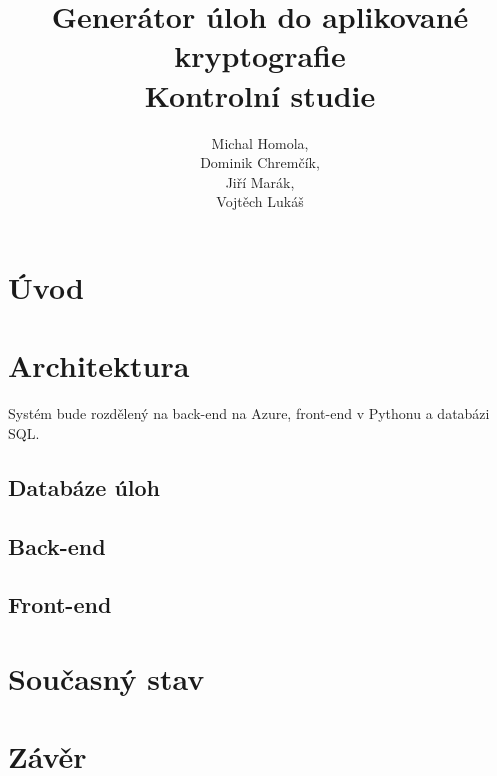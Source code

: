 \documentclass[titlepage]{article}
\title{Generátor úloh do aplikované kryptografie\\Kontrolní studie}
\author{Michal Homola,\\Dominik Chremčík,\\Jiří Marák,\\Vojtěch Lukáš}
\begin{document}
\maketitle

\tableofcontents

\section*{Úvod}

\section{Architektura}
Systém bude rozdělený na back-end na Azure, front-end v Pythonu a databázi SQL. 

\subsection{Databáze úloh}

\subsection{Back-end}

\subsection{Front-end}

\section{Současný stav}

\section*{Závěr}
\end{document}
